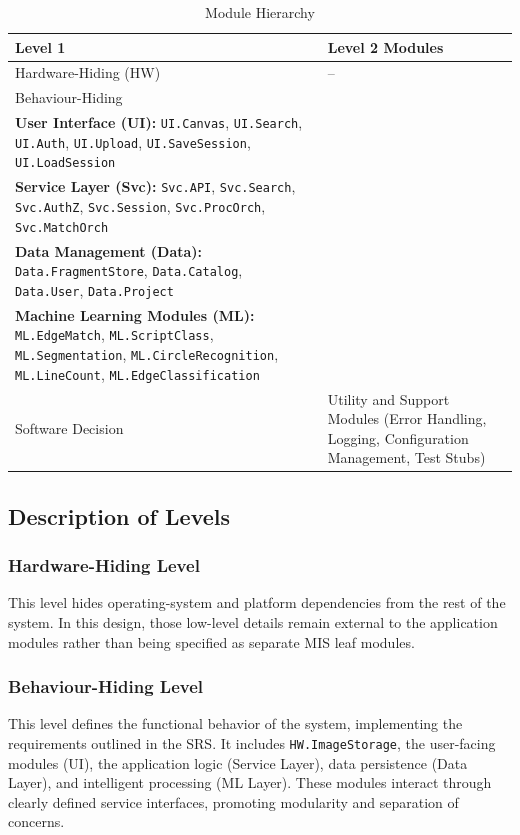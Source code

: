 \documentclass[12pt, titlepage]{article}
\begin{document}
\begin{table}[h!]
\centering
\caption{Module Hierarchy}
\small
\begin{tabular}{ll}
\toprule
\textbf{Level 1} & \textbf{Level 2 Modules} \\
\midrule
Hardware-Hiding (HW) & -- \\
\addlinespace
Behaviour-Hiding & 
\begin{minipage}[t]{0.7\linewidth}
\texttt{HW.ImageStorage}\\
\textbf{User Interface (UI):} \texttt{UI.Canvas}, \texttt{UI.Search}, \texttt{UI.Auth}, \texttt{UI.Upload}, \texttt{UI.SaveSession}, \texttt{UI.LoadSession}\\
\textbf{Service Layer (Svc):} \texttt{Svc.API}, \texttt{Svc.Search}, \texttt{Svc.AuthZ}, \texttt{Svc.Session}, \texttt{Svc.ProcOrch}, \texttt{Svc.MatchOrch}\\
\textbf{Data Management (Data):} \texttt{Data.FragmentStore}, \texttt{Data.Catalog}, \texttt{Data.User}, \texttt{Data.Project}\\
\textbf{Machine Learning Modules (ML):} \texttt{ML.EdgeMatch}, \texttt{ML.ScriptClass}, \texttt{ML.Segmentation}, \texttt{ML.CircleRecognition}, \texttt{ML.LineCount}, \texttt{ML.EdgeClassification}
\end{minipage} \\
\addlinespace
Software Decision & 
\begin{minipage}[t]{0.7\linewidth}
Utility and Support Modules (Error Handling, Logging, Configuration Management, Test Stubs)
\end{minipage} \\
\bottomrule
\end{tabular}
\end{table}

\newpage

\subsection{Description of Levels}

\subsubsection{Hardware-Hiding Level}
This level hides operating-system and platform dependencies from the rest of the system. In this design, those low-level details remain external to the application modules rather than being specified as separate MIS leaf modules.

\subsubsection{Behaviour-Hiding Level}
This level defines the functional behavior of the system, implementing the requirements outlined in the SRS. It includes \texttt{HW.ImageStorage}, the user-facing modules (UI), the application logic (Service Layer), data persistence (Data Layer), and intelligent processing (ML Layer). These modules interact through clearly defined service interfaces, promoting modularity and separation of concerns.
\end{document}
